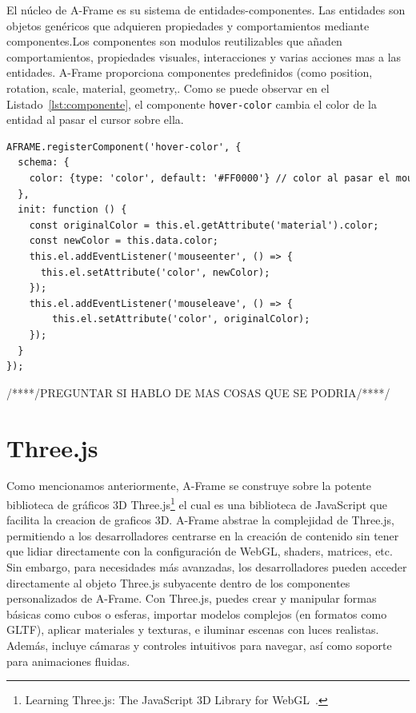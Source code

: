 \documentclass[a4paper, 12pt]{book}
\let\cleardoublepage\clearpage
\begin{document}
El núcleo de A-Frame es su sistema de entidades-componentes. Las entidades son objetos genéricos que adquieren propiedades y comportamientos mediante componentes.Los componentes son modulos reutilizables que añaden comportamientos, propiedades visuales, interacciones y varias acciones mas a las entidades. A-Frame proporciona componentes predefinidos  (como position, rotation, scale, material, geometry,\cdot. Como se puede observar en el Listado~\ref{lst:componente}, el componente \texttt{hover-color} cambia el color de la entidad al pasar el cursor sobre ella.


\begin{lstlisting}[language=HTML, caption=Crear Componente, captionpos=b, label=lst:componente]
AFRAME.registerComponent('hover-color', {
  schema: {
    color: {type: 'color', default: '#FF0000'} // color al pasar el mouse
  },
  init: function () {
    const originalColor = this.el.getAttribute('material').color;
    const newColor = this.data.color;
    this.el.addEventListener('mouseenter', () => {
      this.el.setAttribute('color', newColor);
    });
    this.el.addEventListener('mouseleave', () => {
        this.el.setAttribute('color', originalColor);
    });
  }
});
\end{lstlisting}


/****/PREGUNTAR SI HABLO DE MAS COSAS QUE SE PODRIA/****/
\cleardoublepage
\section{Three.js} 
\label{sec:seccion3}

Como mencionamos anteriormente, A-Frame se construye sobre la potente biblioteca de gráficos 3D Three.js\footnote{Learning Three.js: The 
JavaScript 3D Library for 
WebGL~\cite{dirksen2013learning}.} el cual es una biblioteca de JavaScript que facilita la creacion de graficos 3D. A-Frame abstrae la complejidad de Three.js, permitiendo a los desarrolladores centrarse en la creación de contenido sin tener que lidiar directamente con la configuración de WebGL, shaders, matrices, etc. Sin embargo, para necesidades más avanzadas, los desarrolladores pueden acceder directamente al objeto Three.js subyacente dentro de los componentes personalizados de A-Frame.
Con Three.js, puedes crear y manipular formas básicas como cubos o esferas, importar modelos complejos (en formatos como GLTF), aplicar materiales y texturas, e iluminar escenas con luces realistas. Además, incluye cámaras y controles intuitivos para navegar, así como soporte para animaciones fluidas. 
\end{document}
